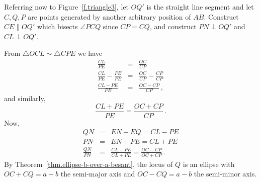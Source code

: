 
Referring now to Figure~\ref{f.triangle3}, let $OQ'$ is the straight line segment and let $C,Q,P$ are points generated by another arbitrary position of $AB$. Construct $CE\parallel OQ'$ which bisects $\angle PCQ$ since $CP=CQ$, and construct $PN\perp OQ'$ and $CL\perp OQ'$.

From $\triangle OCL\sim \triangle CPE$ we have
\begin{eqnarray*}
\frac{CL}{PE}&=&\frac{OC}{CP}\\[4pt]
\frac{CL}{PE}-\frac{PE}{PE}&=&\frac{OC}{CP}-\frac{CP}{CP}\\[4pt]
\frac{CL-PE}{PE}&=&\frac{OC-CP}{CP}\,,
\end{eqnarray*}
and similarly,
\[
\frac{CL+PE}{PE}=\frac{OC+CP}{CP}\,.
\]
Now,
\begin{eqnarray*}
QN &=& EN - EQ = CL - PE\\
PN &=& EN + PE = CL + PE\\[4pt]
\frac{QN}{PN}&=& \frac{CL-PE}{CL+PE}=\frac{OC-CP}{OC+CP}\,.
\end{eqnarray*}
By Theorem~\ref{thm.ellipse-b-over-a-besant}, the locus of $Q$ is an ellipse with $OC+CQ=a+b$ the semi-major axis and $OC-CQ=a-b$ the semi-minor axis.


